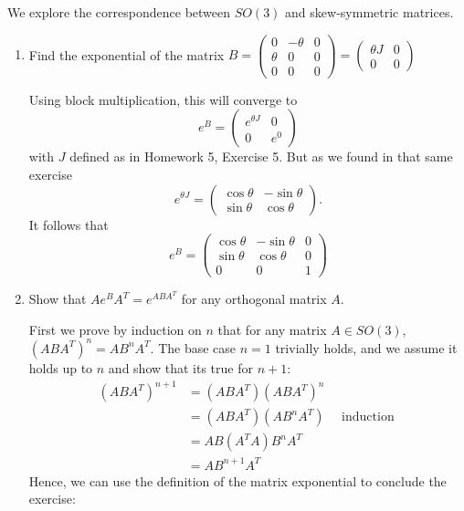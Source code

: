 \documentclass[12pt,onecolumn]{article}
\begin{document}
\begin{exercise} We explore the correspondence between $SO(3)$ and skew-symmetric matrices.
\begin{enumerate}[label=(\alph*)]
    \item Find the exponential of the matrix $B = \begin{pmatrix} 0 & -\theta & 0 \\ \theta & 0 & 0 \\ 0 & 0 & 0 \end{pmatrix} = \begin{pmatrix} \theta J & 0 \\ 0 & 0 \end{pmatrix}$
    \begin{answer}
    Using block multiplication, this will converge to $$ e^B = \begin{pmatrix} e^{\theta J} & 0 \\ 0 & e^0 \end{pmatrix}$$
    with $J$ defined as in Homework 5, Exercise 5. But as we found in that same exercise
    $$ e^{\theta J} = \begin{pmatrix} \cos{\theta} & -\sin{\theta} \\ \sin{\theta} & \cos{\theta} \end{pmatrix}.$$
    It follows that $$e^B = 
    \begin{pmatrix} 
    \cos{\theta} & -\sin{\theta} & 0 \\
    \sin{\theta} & \cos{\theta} & 0\\ 
    0 & 0 & 1 
    \end{pmatrix}$$
    \end{answer}
    \item Show that $Ae^BA^T =e^{ABA^T}$ for any orthogonal matrix $A$. 
    \begin{answer}
    First we prove by induction on $n$ that for any matrix $A \in SO(3)$, $(ABA^T)^n = AB^nA^T$. The base case $n=1$ trivially holds, and we assume it holds up to $n$ and show that its true for $n+1$:
    \begin{align*}
        (ABA^T)^{n+1} &= (ABA^T)(ABA^T)^{n} \\
        &= (ABA^T)(AB^nA^T) \quad \text{ induction }\\
        &= AB(A^TA)B^nA^T \\
        &= AB^{n+1}A^T
    \end{align*}
    Hence, we can use the definition of the matrix exponential to conclude the exercise:
    \begin{align*}

\end{align*}
\end{answer}
\end{enumerate}
\end{exercise}
\end{document}
